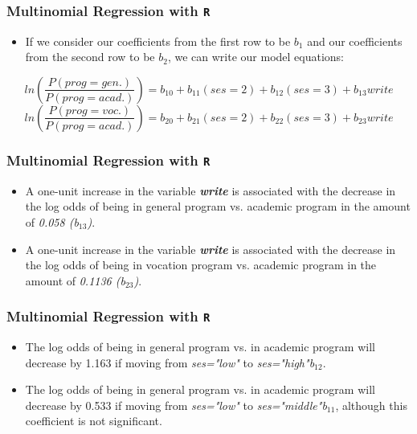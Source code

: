 \documentclass[00-GLMregslides.tex]{subfiles}
\begin{document}
\begin{frame}[fragile]
\frametitle{Multinomial Regression with \texttt{R}}
\Large
\begin{itemize}
\item If we consider our coefficients from the first row to be $b_1$ and our coefficients from the second row to be $b_2$, we can write our model equations:
\end{itemize}
{\normalsize
	
	\hspace{-0.95cm} \[ ln\left(\frac{P(prog=gen.)}{P(prog=acad.)}\right) = b_{10} + b_{11}(ses=2) + b_{12}(ses=3) + b_{13}write \] \[ ln\left(\frac{P(prog=voc.)}{P(prog=acad.)}\right) = b_{20} + b_{21}(ses=2) + b_{22}(ses=3) + b_{23}write \] 
}

\end{frame}
\begin{frame}[fragile]
	
	\frametitle{Multinomial Regression with \texttt{R}}
	\Large
	\begin{itemize}

\item A one-unit increase in the variable \textbf{\textit{write}} is associated with the decrease in the log odds of being in general program vs. academic program in the amount of \textit{0.058 (b$_{13}$)}.
\smallskip
\item A one-unit increase in the variable \textbf{\textit{write}} is associated with the decrease 
in the log odds of being in vocation program vs. academic program in the amount of \textit{0.1136 (b$_{23}$)}.
\end{itemize}
\end{frame}
\begin{frame}[fragile]

\frametitle{Multinomial Regression with \texttt{R}}
\Large
\begin{itemize}
\item The log odds of being in general program vs. in academic program will decrease by 
1.163 if moving from \textit{ses="low"} to \textit{ses="high"b$_{12}$}.
\smallskip
\item The log odds of being in general program vs. in academic 
program will decrease by 0.533 if moving from \textit{ses="low"} to \textit{ses="middle"b$_{11}$}, 
although this coefficient is not significant.
\end{itemize}
\end{frame}
\end{document}
